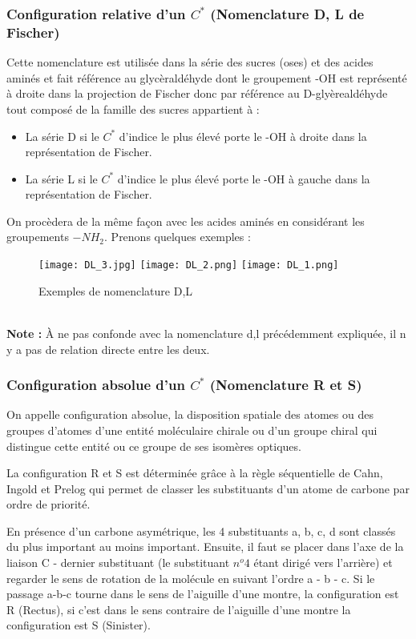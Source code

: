 \documentclass[a4paper, oneside]{book}
\begin{document}
\subsubsection{Configuration relative d'un $C^*$ (Nomenclature D, L de Fischer)}
Cette nomenclature est utilisée dans la série des sucres (oses) et des acides aminés et fait référence au glycèraldéhyde dont le groupement -OH est représenté à droite dans la projection de Fischer donc par référence au D-glyèrealdéhyde tout composé de la famille des sucres appartient à :
\begin{itemize}
    \item La série D si le $C^*$ d'indice le plus élevé porte le -OH à droite dans la représentation de Fischer.
    \item La série L si le $C^*$ d'indice le plus élevé porte le -OH à gauche dans la représentation de Fischer.
\end{itemize}
On procèdera de la même façon avec les acides aminés en considérant les groupements $-NH_2$.
Prenons quelques exemples : 
\begin{figure}[!h]
    \centering
    \texttt{[image: DL\_3.jpg]}
    \texttt{[image: DL\_2.png]}
    \texttt{[image: DL\_1.png]}
    \caption{Exemples de nomenclature D,L}
    \label{fig:my_label}
\end{figure}\\
\textbf{Note :} \`A ne pas confonde avec la nomenclature d,l précédemment expliquée, il n y a pas de relation directe entre les deux.
\subsubsection{Configuration absolue d'un $C^*$ (Nomenclature R et S)}
On appelle configuration absolue, la disposition spatiale des atomes ou des groupes d'atomes d'une entité moléculaire chirale ou d'un groupe chiral qui distingue cette entité ou ce groupe de ses isomères optiques.

La configuration R et S est déterminée grâce à la règle séquentielle de Cahn, Ingold et Prelog qui permet de classer les substituants d'un atome de carbone par ordre de priorité.

En présence d'un carbone asymétrique, les 4 substituants a, b, c, d sont classés du plus important au moins important. Ensuite, il faut se placer dans l'axe de la liaison C - dernier substituant (le substituant $n^o4$ étant dirigé vers l’arrière) et regarder le sens de rotation de la molécule en suivant l'ordre a - b - c.
Si le passage a-b-c tourne dans le sens de l'aiguille d'une montre, la configuration est R (Rectus), si c'est dans le sens contraire de l'aiguille d'une montre la configuration est S (Sinister).
\end{document}

